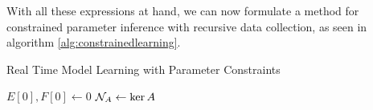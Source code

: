 With all these expressions at hand, we can now formulate a method for constrained
parameter inference with recursive data collection, as seen in algorithm \ref{alg:constrainedlearning}.
\begin{algorithm}
    \caption{Real Time Model Learning with Parameter Constraints}
    \label{alg:constrainedlearning}
    $E[0], F[0] \gets 0$\;
    $\mathcal{N}_A \gets \ker A$\;
\end{algorithm}